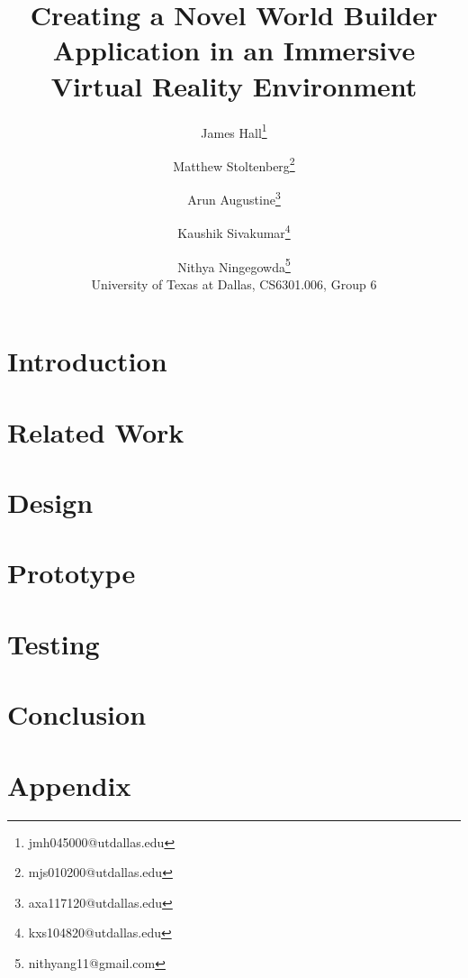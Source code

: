 \documentclass{vgtc}
\title{Creating a Novel World Builder Application in an Immersive Virtual Reality Environment}
\author{James Hall\thanks{jmh045000@utdallas.edu}
\and Matthew Stoltenberg\thanks{mjs010200@utdallas.edu}
\and Arun Augustine\thanks{axa117120@utdallas.edu}
\and Kaushik Sivakumar\thanks{kxs104820@utdallas.edu}
\and Nithya Ningegowda\thanks{nithyang11@gmail.com}
\\ \scriptsize University of Texas at Dallas, CS6301.006, Group 6}
\begin{document}
\maketitle

\section{Introduction}


\section{Related Work}


\section{Design}


\section{Prototype}


\section{Testing}


\section{Conclusion}


\section{Appendix}




\end{document}
